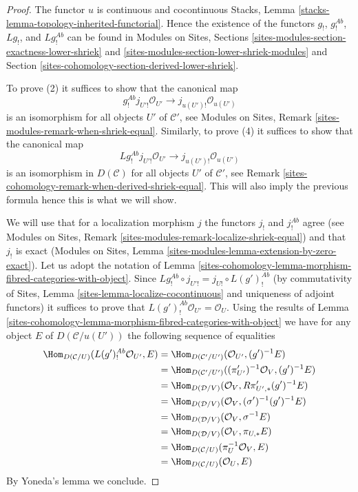\begin{proof}
The functor $u$ is continuous and cocontinuous
Stacks, Lemma \ref{stacks-lemma-topology-inherited-functorial}.
Hence the existence of the functors $g_!$, $g_!^{\textit{Ab}}$,
$Lg_!$, and $Lg_!^{\textit{Ab}}$ can be found in
Modules on Sites, Sections
\ref{sites-modules-section-exactness-lower-shriek} and
\ref{sites-modules-section-lower-shriek-modules}
and
Section \ref{sites-cohomology-section-derived-lower-shriek}.

\medskip\noindent
To prove (2) it suffices to show that the canonical map
$$
g_!^{\textit{Ab}}j_{U'!}\mathcal{O}_{U'} \to j_{u(U')!}\mathcal{O}_{u(U')}
$$
is an isomorphism for all objects $U'$ of $\mathcal{C}'$, see
Modules on Sites, Remark \ref{sites-modules-remark-when-shriek-equal}.
Similarly, to prove (4) it suffices to show that the canonical map
$$
Lg_!^{\textit{Ab}}j_{U'!}\mathcal{O}_{U'} \to j_{u(U')!}\mathcal{O}_{u(U')}
$$
is an isomorphism in $D(\mathcal{C})$ for all objects $U'$ of
$\mathcal{C}'$, see Remark \ref{sites-cohomology-remark-when-derived-shriek-equal}.
This will also imply the previous formula hence this is what we will show.

\medskip\noindent
We will use that for a localization morphism $j$ the
functors $j_!$ and $j_!^{\textit{Ab}}$ agree (see
Modules on Sites, Remark \ref{sites-modules-remark-localize-shriek-equal})
and that $j_!$ is exact
(Modules on Sites, Lemma \ref{sites-modules-lemma-extension-by-zero-exact}).
Let us adopt the notation of
Lemma \ref{sites-cohomology-lemma-morphism-fibred-categories-with-object}.
Since $Lg_!^{\textit{Ab}} \circ j_{U'!} = j_{U!} \circ L(g')^{\textit{Ab}}_!$
(by commutativity of Sites, Lemma \ref{sites-lemma-localize-cocontinuous}
and uniqueness of adjoint functors) it suffices to prove that
$L(g')^{\textit{Ab}}_!\mathcal{O}_{U'} = \mathcal{O}_U$. Using the
results of
Lemma \ref{sites-cohomology-lemma-morphism-fibred-categories-with-object}
we have for any object $E$ of $D(\mathcal{C}/u(U'))$ the following
sequence of equalities
\begin{align*}
\Hom_{D(\mathcal{C}/U)}(L(g')_!^{\textit{Ab}}\mathcal{O}_{U'}, E)
& =
\Hom_{D(\mathcal{C}'/U')}(\mathcal{O}_{U'}, (g')^{-1}E) \\
& =
\Hom_{D(\mathcal{C}'/U')}((\pi'_{U'})^{-1}\mathcal{O}_V, (g')^{-1}E) \\
& =
\Hom_{D(\mathcal{D}/V)}(\mathcal{O}_V, R\pi'_{U', *}(g')^{-1}E) \\
& =
\Hom_{D(\mathcal{D}/V)}(\mathcal{O}_V, (\sigma')^{-1}(g')^{-1}E) \\
& =
\Hom_{D(\mathcal{D}/V)}(\mathcal{O}_V, \sigma^{-1}E) \\
& =
\Hom_{D(\mathcal{D}/V)}(\mathcal{O}_V, \pi_{U, *}E) \\
& =
\Hom_{D(\mathcal{C}/U)}(\pi_U^{-1}\mathcal{O}_V, E) \\
& =
\Hom_{D(\mathcal{C}/U)}(\mathcal{O}_U, E)
\end{align*}
By Yoneda's lemma we conclude.
\end{proof}

